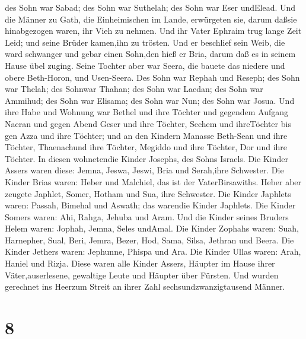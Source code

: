 des Sohn war Sabad; des Sohn war Suthelah; des Sohn war Eser undElead.
Und die Männer zu Gath, die Einheimischen im Lande, erwürgeten sie,
darum daßsie hinabgezogen waren, ihr Vieh zu nehmen.  Und
ihr Vater Ephraim trug lange Zeit Leid; und seine Brüder kamen,ihn zu
trösten.  Und er beschlief sein Weib, die ward schwanger
und gebar einen Sohn,den hieß er Bria, darum daß es in seinem Hause übel
zuging.  Seine Tochter aber war Seera, die bauete das
niedere und obere Beth-Horon, und Usen-Seera.  Des Sohn war
Rephah und Reseph; des Sohn war Thelah; des Sohnwar Thahan;
 des Sohn war Laedan; des Sohn war Ammihud; des Sohn war
Elisama;  des Sohn war Nun; des Sohn war Josua.
 Und ihre Habe und Wohnung war Bethel und ihre Töchter und
gegendem Aufgang Naeran und gegen Abend Geser und ihre Töchter, Sechem
und ihreTöchter bis gen Azza und ihre Töchter;  und an den
Kindern Manasse Beth-Sean und ihre Töchter, Thaenachund ihre Töchter,
Megiddo und ihre Töchter, Dor und ihre Töchter. In diesen wohnetendie
Kinder Josephs, des Sohns Israels.  Die Kinder Assers waren
diese: Jemna, Jeswa, Jeswi, Bria und Serah,ihre Schwester. 
Die Kinder Brias waren: Heber und Malchiel, das ist der VaterBirsawiths.
 Heber aber zeugete Japhlet, Somer, Hotham und Sua, ihre
Schwester.  Die Kinder Japhlets waren: Passah, Bimehal und
Aswath; das warendie Kinder Japhlets.  Die Kinder Somers
waren: Ahi, Rahga, Jehuba und Aram.  Und die Kinder seines
Bruders Helem waren: Jophah, Jemna, Seles undAmal.  Die
Kinder Zophahs waren: Suah, Harnepher, Sual, Beri, Jemra, 
Bezer, Hod, Sama, Silsa, Jethran und Beera.  Die Kinder
Jethers waren: Jephunne, Phispa und Ara.  Die Kinder Ullas
waren: Arah, Haniel und Rizja.  Diese waren alle Kinder
Assers, Häupter im Hause ihrer Väter,auserlesene, gewaltige Leute und
Häupter über Fürsten. Und wurden gerechnet ins Heerzum Streit an ihrer
Zahl sechsundzwanzigtausend Männer.

\hypertarget{section-7}{%
\section{8}\label{section-7}}

